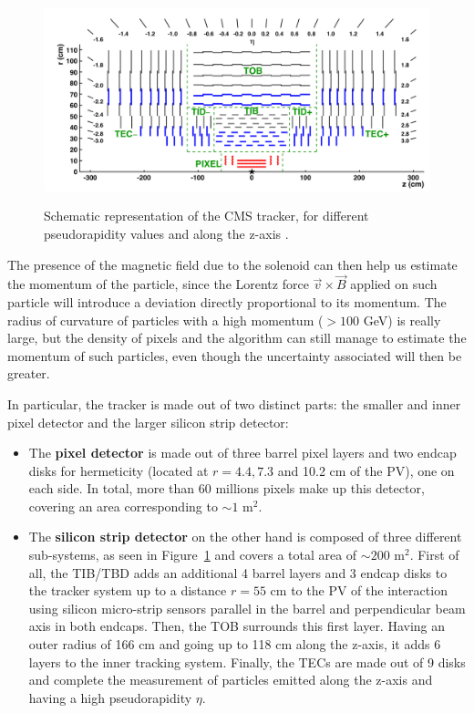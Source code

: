 \documentclass[a4paper, 10pt, openright]{report}
\begin{document}
\begin{figure}[htbp]
\begin{center}
\includegraphics[width=12cm, height=6cm]{figs/CMSTracker.png}
\caption{Schematic representation of the \ac{CMS} tracker, for different pseudorapidity values and along the z-axis \cite{CMSTracker}.}
\label{fig:CMSTracker}
\end{center}
\end{figure}

The presence of the magnetic field due to the solenoid can then help us estimate the momentum of the particle, since the Lorentz force $\overrightarrow{v} \times \overrightarrow{B}$ applied on such particle will introduce a deviation directly proportional to its momentum. The radius of curvature of particles with a high momentum ($> 100$ GeV) is really large, but the density of pixels and the algorithm can still manage to estimate the momentum of such particles, even though the uncertainty associated will then be greater.

In particular, the tracker is made out of two distinct parts: the smaller and inner pixel detector and the larger silicon strip detector:

\begin{itemize}
\item The \textbf{pixel detector} is made out of three barrel pixel layers and two endcap disks for hermeticity (located at $r=4.4, 7.3$ and 10.2 cm of the \ac{PV}), one on each side. In total, more than 60 millions pixels make up this detector, covering an area corresponding to $\sim 1$ m$^2$.
\item The \textbf{silicon strip detector} on the other hand is composed of three different sub-systems, as seen in Figure~\ref{fig:CMSTracker} and covers a total area of $\sim 200$ m$^2$. First of all, the \ac{TIB/TBD} adds an additional 4 barrel layers and 3 endcap disks to the tracker system up to a distance $r = 55$ cm to the \ac{PV} of the interaction using silicon micro-strip sensors parallel in the barrel and perpendicular beam axis in both endcaps. Then, the \ac{TOB} surrounds this first layer. Having an outer radius of 166 cm and going up to 118 cm along the z-axis, it adds 6 layers to the inner tracking system. Finally, the \acp{TEC} are made out of 9 disks and complete the measurement of particles emitted along the z-axis and having a high pseudorapidity $\eta$.
\end{itemize}
\end{document}
